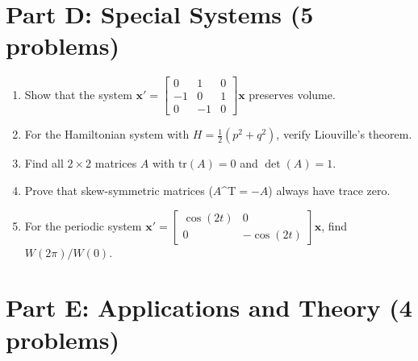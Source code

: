 \documentclass[12pt]{article}
\begin{document}
\section*{Part D: Special Systems (5 problems)}

\begin{enumerate}[resume]
\item Show that the system $\mathbf{x}' = \begin{bmatrix} 0 & 1 & 0 \\ -1 & 0 & 1 \\ 0 & -1 & 0 \end{bmatrix}\mathbf{x}$ preserves volume.

\item For the Hamiltonian system with $H = \frac{1}{2}(p^{2} + q^{2})$, verify Liouville's theorem.

\item Find all $2 \times 2$ matrices $A$ with $\text{tr}(A) = 0$ and $\det(A) = 1$.

\item Prove that skew-symmetric matrices ($A$^{T}$ = -A$) always have trace zero.

\item For the periodic system $\mathbf{x}' = \begin{bmatrix} \cos(2t) & 0 \\ 0 & -\cos(2t) \end{bmatrix}\mathbf{x}$, find $W(2\pi)/W(0)$.
\end{enumerate}

\section*{Part E: Applications and Theory (4 problems)}

\end{document}
